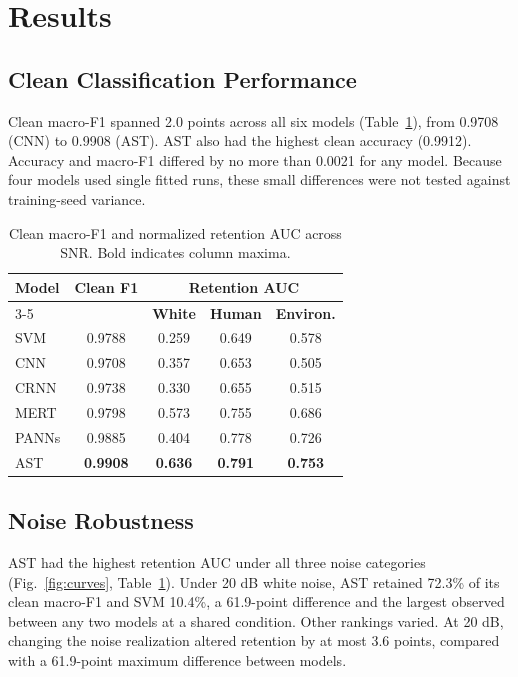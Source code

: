 \documentclass[conference]{IEEEtran}
\begin{document}
\section{Results}

\subsection{Clean Classification Performance}
Clean macro-F1 spanned 2.0 points across all six models (Table~\ref{tab:auc}), from 0.9708 (CNN)
to 0.9908 (AST). AST also had the highest clean accuracy (0.9912). Accuracy and macro-F1 differed by no more than 0.0021 for any model. Because four models used single fitted runs, these small differences were not tested against training-seed variance.

\begin{table}[H]
\caption{Clean macro-F1 and normalized retention AUC across SNR.
Bold indicates column maxima.}
\label{tab:auc}
\centering
\footnotesize
\begin{tabular}{lcccc}
\hline
\textbf{Model} &
\textbf{Clean F1} &
\multicolumn{3}{c}{\textbf{Retention AUC}} \\
\cline{3-5}
& & \textbf{White} & \textbf{Human} & \textbf{Environ.} \\
\hline
SVM   & 0.9788 & 0.259 & 0.649 & 0.578 \\
CNN   & 0.9708 & 0.357 & 0.653 & 0.505 \\
CRNN  & 0.9738 & 0.330 & 0.655 & 0.515 \\
MERT  & 0.9798 & 0.573 & 0.755 & 0.686 \\
PANNs & 0.9885 & 0.404 & 0.778 & 0.726 \\
AST   & \textbf{0.9908} & \textbf{0.636} &
        \textbf{0.791} & \textbf{0.753} \\
\hline
\end{tabular}
\end{table}

\subsection{Noise Robustness}
AST had the highest retention AUC under all three noise categories (Fig.~\ref{fig:curves}, Table~\ref{tab:auc}). Under 20 dB white noise, AST retained 72.3\% of its clean macro-F1 and SVM 10.4\%, a 61.9-point difference and the largest observed between any two models at a shared condition. Other rankings varied. At 20 dB, changing the noise realization altered retention by at most 3.6 points, compared with a 61.9-point maximum difference between models.
\end{document}
